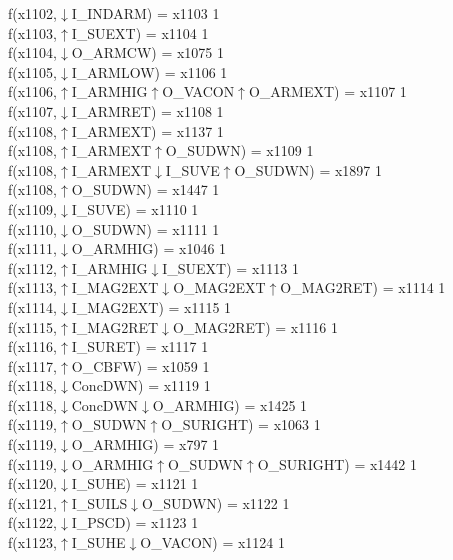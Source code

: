 f(x1102,$\downarrow$I\_INDARM) = x1103 {1} \\
f(x1103,$\uparrow$I\_SUEXT) = x1104 {1} \\
f(x1104,$\downarrow$O\_ARMCW) = x1075 {1} \\
f(x1105,$\downarrow$I\_ARMLOW) = x1106 {1} \\
f(x1106,$\uparrow$I\_ARMHIG$\uparrow$O\_VACON$\uparrow$O\_ARMEXT) = x1107 {1} \\
f(x1107,$\downarrow$I\_ARMRET) = x1108 {1} \\
f(x1108,$\uparrow$I\_ARMEXT) = x1137 {1} \\
f(x1108,$\uparrow$I\_ARMEXT$\uparrow$O\_SUDWN) = x1109 {1} \\
f(x1108,$\uparrow$I\_ARMEXT$\downarrow$I\_SUVE$\uparrow$O\_SUDWN) = x1897 {1} \\
f(x1108,$\uparrow$O\_SUDWN) = x1447 {1} \\
f(x1109,$\downarrow$I\_SUVE) = x1110 {1} \\
f(x1110,$\downarrow$O\_SUDWN) = x1111 {1} \\
f(x1111,$\downarrow$O\_ARMHIG) = x1046 {1} \\
f(x1112,$\uparrow$I\_ARMHIG$\downarrow$I\_SUEXT) = x1113 {1} \\
f(x1113,$\uparrow$I\_MAG2EXT$\downarrow$O\_MAG2EXT$\uparrow$O\_MAG2RET) = x1114 {1} \\
f(x1114,$\downarrow$I\_MAG2EXT) = x1115 {1} \\
f(x1115,$\uparrow$I\_MAG2RET$\downarrow$O\_MAG2RET) = x1116 {1} \\
f(x1116,$\uparrow$I\_SURET) = x1117 {1} \\
f(x1117,$\uparrow$O\_CBFW) = x1059 {1} \\
f(x1118,$\downarrow$ConcDWN) = x1119 {1} \\
f(x1118,$\downarrow$ConcDWN$\downarrow$O\_ARMHIG) = x1425 {1} \\
f(x1119,$\uparrow$O\_SUDWN$\uparrow$O\_SURIGHT) = x1063 {1} \\
f(x1119,$\downarrow$O\_ARMHIG) = x797 {1} \\
f(x1119,$\downarrow$O\_ARMHIG$\uparrow$O\_SUDWN$\uparrow$O\_SURIGHT) = x1442 {1} \\
f(x1120,$\downarrow$I\_SUHE) = x1121 {1} \\
f(x1121,$\uparrow$I\_SUILS$\downarrow$O\_SUDWN) = x1122 {1} \\
f(x1122,$\downarrow$I\_PSCD) = x1123 {1} \\
f(x1123,$\uparrow$I\_SUHE$\downarrow$O\_VACON) = x1124 {1} \\
